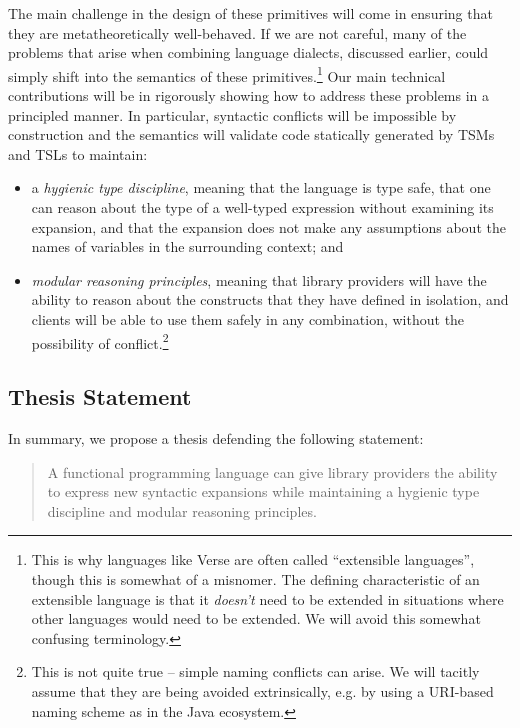 The main challenge in the design of these primitives will come in ensuring that they are metatheoretically well-behaved. If we are not careful, many of the problems  that arise when combining language dialects, discussed earlier, could simply shift into the semantics of these primitives.\footnote{This is why languages  like Verse are often called ``extensible languages'', though this is somewhat of a misnomer. The defining characteristic of an extensible language is that it \emph{doesn't} need to be extended in situations where other languages would need to be extended. We will avoid this somewhat confusing terminology.} Our main technical contributions will be in rigorously showing how to address these problems in a principled manner. In particular, syntactic conflicts will be impossible by construction and the semantics will validate code statically generated by TSMs and TSLs to maintain:
\begin{itemize}
\item a \emph{hygienic type discipline}, meaning that the language is type safe, that one can reason about the type of a well-typed expression without examining its expansion, and that the expansion does not make any assumptions about the names of variables in the surrounding context; and
\item \emph{modular reasoning principles}, meaning that library providers will have the ability to reason about the constructs that they have defined in isolation, and clients will be able to use them safely in any combination, without the possibility of conflict.\footnote{This is not quite true -- simple naming conflicts can arise. We will tacitly assume that they are being avoided extrinsically, e.g. by using a URI-based naming scheme as in the Java ecosystem.} 
\end{itemize}

\subsection{Thesis Statement}
In summary, we propose a thesis defending the following statement:
\begin{quote}
A functional programming language can give library providers the ability to %
express new syntactic expansions while maintaining a hygienic type discipline and modular reasoning principles. %
\end{quote}

